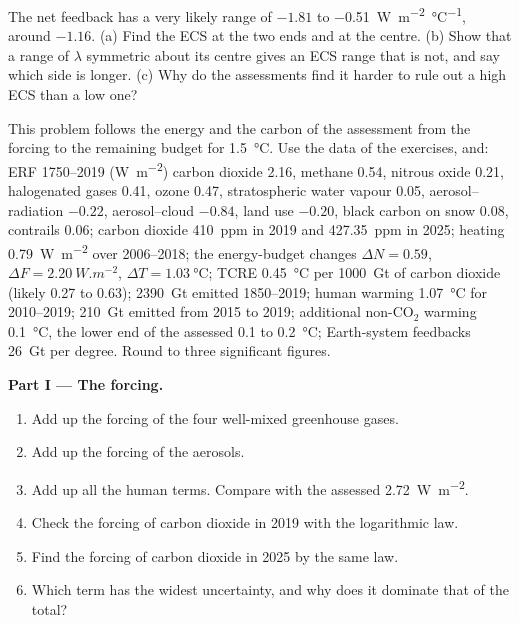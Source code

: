 \begin{exercise}[$\star\star\star$]\label{exo:b2:anthropogenic-climate-change:12}
The net feedback has a very likely range of $-1.81$ to \qty{-0.51}{W.m^{-2}.\celsius^{-1}}, around
$-1.16$. (a) Find the ECS at the two ends and at the centre. (b) Show that a range of $\lambda$
symmetric about its centre gives an ECS range that is not, and say which side is longer. (c) Why
do the assessments find it harder to rule out a high ECS than a low one?
\end{exercise}

\begin{problem}\label{pb:b2:anthropogenic-climate-change:1}
This problem follows the energy and the carbon of the assessment from the forcing to the remaining
budget for \qty{1.5}{\celsius}. Use the data of the exercises, and: ERF 1750--2019 (\unit{W.m^{-2}})
carbon dioxide 2.16, methane 0.54, nitrous oxide 0.21, halogenated gases 0.41, ozone 0.47,
stratospheric water vapour 0.05, aerosol--radiation $-0.22$, aerosol--cloud $-0.84$, land use
$-0.20$, black carbon on snow 0.08, contrails 0.06; carbon dioxide \qty{410}{ppm} in 2019 and
\qty{427.35}{ppm} in 2025; heating \qty{0.79}{W.m^{-2}} over 2006--2018; the energy-budget changes
$\Delta N = 0.59$, $\Delta F = \qty{2.20}{W.m^{-2}}$, $\Delta T = \qty{1.03}{\celsius}$; TCRE
\qty{0.45}{\celsius} per \qty{1000}{Gt} of carbon dioxide (likely 0.27 to 0.63); \qty{2390}{Gt}
emitted 1850--2019; human warming \qty{1.07}{\celsius} for 2010--2019; \qty{210}{Gt} emitted from
2015 to 2019; additional non-CO$_2$ warming \qty{0.1}{\celsius}, the lower end of the assessed 0.1
to \qty{0.2}{\celsius}; Earth-system feedbacks \qty{26}{Gt} per degree. Round to three significant
figures.

\noindent\textbf{Part I --- The forcing.}
\begin{enumerate}
  \item Add up the forcing of the four well-mixed greenhouse gases.
  \item Add up the forcing of the aerosols.
  \item Add up all the human terms. Compare with the assessed \qty{2.72}{W.m^{-2}}.
  \item Check the forcing of carbon dioxide in 2019 with the logarithmic law.
  \item Find the forcing of carbon dioxide in 2025 by the same law.
  \item Which term has the widest uncertainty, and why does it dominate that of the total?
\end{enumerate}


\end{problem}
